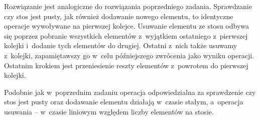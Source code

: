 \exercise %
Rozwiązanie jest analogiczne do rozwiązania poprzedniego zadania.
Sprawdzanie czy stos jest pusty, jak również dodawanie nowego elementu, to identyczne operacje wywoływane na pierwszej kolejce.
Usuwanie elementu ze stosu odbywa się poprzez pobranie wszystkich elementów z~wyjątkiem ostatniego z~pierwszej kolejki i~dodanie tych elementów do drugiej.
Ostatni z~nich także usuwamy z~kolejki, zapamiętawszy go w~celu późniejszego zwrócenia jako wyniku operacji.
Ostatnim krokiem jest przeniesienie reszty elementów z~powrotem do pierwszej kolejki.

Podobnie jak w~poprzednim zadaniu operacja odpowiedzialna za sprawdzenie czy stos jest pusty oraz dodawanie elementu działają w~czasie stałym, a~operacja usuwania -- w~czasie liniowym względem liczby elementów na stosie.
